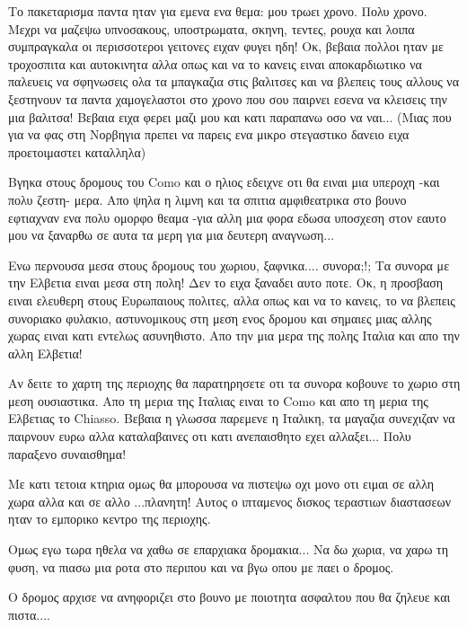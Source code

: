 Το πακεταρισμα παντα ηταν για εμενα ενα θεμα: μου τρωει χρονο. Πολυ χρονο. Μεχρι να μαζεψω υπνοσακους, υποστρωματα, σκηνη, τεντες, ρουχα και λοιπα συμπραγκαλα οι περισσοτεροι γειτονες ειχαν φυγει ηδη! Οκ, βεβαια πολλοι ηταν με τροχοσπιτα και αυτοκινητα αλλα οπως και να το κανεις ειναι αποκαρδιωτικο να παλευεις να σφηνωσεις ολα τα μπαγκαζια στις βαλιτσες και να βλεπεις τους αλλους να ξεστηνουν τα παντα χαμογελαστοι στο χρονο που σου παιρνει εσενα να κλεισεις την μια βαλιτσα! 
Βεβαια ειχα φερει μαζι μου και κατι παραπανω οσο να ναι... (Μιας που για να φας στη Νορβηγια πρεπει να παρεις ενα μικρο στεγαστικο δανειο ειχα προετοιμαστει καταλληλα)


Βγηκα στους δρομους του Como και ο ηλιος εδειχνε οτι θα ειναι μια υπεροχη -και πολυ ζεστη- μερα. 
Απο ψηλα η λιμνη και τα σπιτια αμφιθεατρικα στο βουνο εφτιαχναν ενα πολυ ομορφο θεαμα -για αλλη μια φορα εδωσα υποσχεση στον εαυτο μου να ξαναρθω σε αυτα τα μερη για μια δευτερη αναγνωση...


Ενω περνουσα μεσα στους δρομους του χωριου, ξαφνικα.... συνορα;!; Τα συνορα με την Ελβετια ειναι μεσα στη πολη! 
Δεν το ειχα ξαναδει αυτο ποτε. Οκ, η προσβαση ειναι ελευθερη στους Ευρωπαιους πολιτες, αλλα οπως και να το κανεις, το να βλεπεις συνοριακο φυλακιο, αστυνομικους στη μεση ενος δρομου και σημαιες μιας αλλης χωρας ειναι κατι εντελως ασυνηθιστο. 
Απο την μια μερα της πολης Ιταλια και απο την αλλη Ελβετια!


Αν δειτε το χαρτη της περιοχης θα παρατηρησετε οτι τα συνορα κοβουνε το χωριο στη μεση ουσιαστικα. Απο τη μερια της Ιταλιας ειναι το Como και απο τη μερια της Ελβετιας το Chiasso. Βεβαια η γλωσσα παρεμενε η Ιταλικη, τα μαγαζια συνεχιζαν να παιρνουν ευρω αλλα καταλαβαινες οτι κατι ανεπαισθητο εχει αλλαξει... Πολυ παραξενο συναισθημα! 

Με κατι τετοια κτηρια ομως θα μπορουσα να πιστεψω οχι μονο οτι ειμαι σε αλλη χωρα αλλα και σε αλλο ...πλανητη! Αυτος ο ιπταμενος δισκος τεραστιων διαστασεων ηταν το εμπορικο κεντρο της περιοχης.


Ομως εγω τωρα ηθελα να χαθω σε επαρχιακα δρομακια... 
Να δω χωρια, να χαρω τη φυση, να πιασω μια ροτα στο περιπου και να βγω οπου με παει ο δρομος.


Ο δρομος αρχισε να ανηφοριζει στο βουνο με ποιοτητα ασφαλτου που θα ζηλευε και πιστα....

